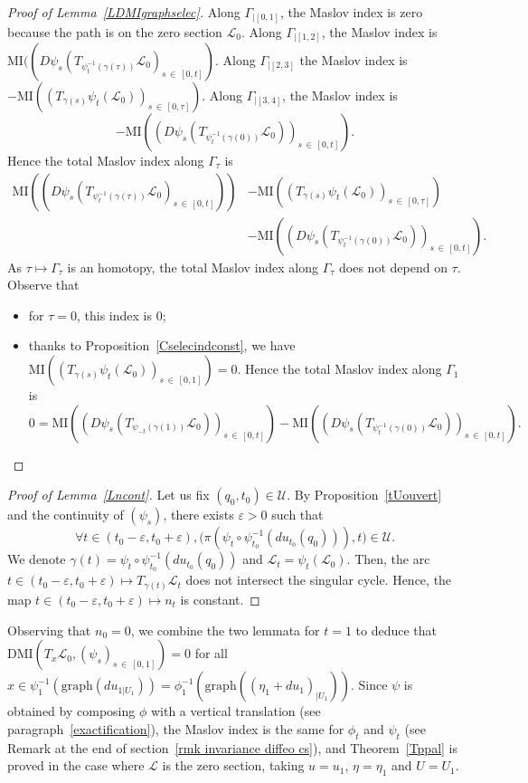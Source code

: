 \documentclass[AHL, Unicode, longabstracts, published]{cedram}
\newcommand*\cl{\mathcal{L}}
\newcommand*\cU{\mathcal{U}}
\newcommand{\DMI}{\mathrm{DMI}}
\newcommand{\MI}{\mathrm{MI}}
\newcommand{\Graph}{\mathrm{graph}}
\let\oldforall\forall
\renewcommand*{\forall}{\mathrel{\oldforall}}
\begin{document}
\begin{proof}[Proof of Lemma~\ref{LDMIgraphselec}]
Along $\Gamma_{|[0, 1]}$, the Maslov index is zero because the path is on the zero section $\cl_0$. Along $\Gamma_{|[1, 2]}$, the Maslov index is $\MI((D\psi_{s}(T_{\psi_{t}^{-1}(\gamma(\tau))}\cl_0)_{s\,\in\,[0,t]})$. Along $\Gamma_{|[2, 3]}$ the Maslov index is $-\MI((T_{\gamma(s)}\psi_t(\cl_0))_{s\,\in\,[0,\tau]})$. Along $\Gamma_{|[3, 4]}$, the Maslov index is 
\[
-\MI\left(\left(D\psi_{s} \left(T_{\psi_{t}^{-1}(\gamma(0))}\cl_0\right)\right)_{s\,\in\,[0,t]}\right).
\]
Hence the total Maslov index along $\Gamma_\tau$ is
\begin{align*}
\MI\left(\left(D\psi_{s}\left(T_{\psi_{t}^{-1}(\gamma(\tau))}\cl_0\right)_{s\,\in\,[0,t]}\right)\right) &-\MI\left(\left(T_{\gamma(s)}\psi_t(\cl_0)\right)_{s\,\in\,[0,\tau]}\right)\\
&-\MI\left(\left(D\psi_{s}\left(T_{\psi_{t}^{-1}(\gamma(0))}\cl_0\right)\right)_{s\,\in\,[0,t]}\right).
\end{align*}
As $\tau\mapsto \Gamma_\tau$ is an homotopy, the total Maslov index along $\Gamma_\tau$ does not depend on $\tau$. Observe that
\begin{itemize}
\item for $\tau=0$, this index is $0$;
\item thanks to Proposition~\ref{Cselecindconst}, we have $\MI((T_{\gamma(s)}\psi_t(\cl_0)) _{s\,\in\,[0,1]})=0$. Hence the total Maslov index along $\Gamma_1$ is
\[
0=\MI\left(\left(D\psi_{s}\left(T_{\psi_{-t}(\gamma(1))}\cl_0\right)\right)_{s\,\in\,[0,t]}\right)-\MI\left(\left(D\psi_{s} \left(T_{\psi_{t}^{-1}(\gamma(0))}\cl_0\right)\right)_{s\,\in\,[0,t]}\right).
\]
\end{itemize}
\end{proof}

\begin{proof}[Proof of Lemma~\ref{Lncont}]
Let us fix $(q_0,t_0)\in \cU$. By Proposition~\ref{tUouvert} and the continuity of $(\psi_s)$, there exists $\varepsilon>0$ such that
\[
\forall t\in (t_0-\varepsilon, t_0+\varepsilon), \big({ \pi} \left( \psi_t\circ \psi_{t_0}^{-1}({ du_{t_0} (q_0)})\right),t\big)\in\cU.
\]
We denote $\gamma(t)=\psi_t\circ \psi_{t_0}^{-1}({ du_{t_0} (q_0)})$ and $\cl_t=\psi_t(\cl_0)$. Then, the arc $t\in(t_0-\varepsilon, t_0+\varepsilon)\mapsto T_{\gamma(t)}\cl_t $ does not intersect the singular cycle. Hence, the map $t\in (t_0-\varepsilon, t_0+\varepsilon)\mapsto n_t$ is constant.
\end{proof}

Observing that $n_0=0$, we combine the two lemmata for $t=1$ to deduce that $\DMI(T_x\cl_0,(\psi_s)_{s\,\in\,[0,1]})=0$ for all $x\in \psi_1^{-1}(\Graph(du_{1|U_1}))= \phi_1^{-1}(\Graph((\eta_1+du_1)_{|U_1}))$. Since $\psi$ is obtained by composing $\phi$ with a vertical translation (see paragraph~\ref{exactification}), the Maslov index is the same for $\phi_t$ and $\psi_t$ (see Remark { at the end of section}~\ref{rmk invariance diffeo cs}), and Theorem~\ref{Tppal} is proved in the case where $\cl$ is the zero section, taking $u=u_1$, $\eta=\eta_1$ and $U=U_1$.
\end{document}
